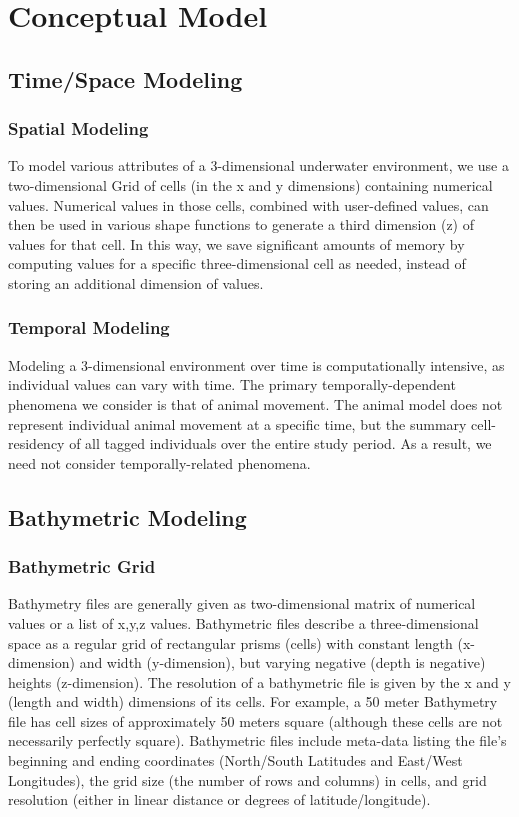 \section{Conceptual Model}
\label{conceptualModel}
\subsection{Time/Space Modeling}
\label{timeSpaceModel}
\subsubsection{Spatial Modeling}
\label{spatialModeling}
To model various attributes of a 3-dimensional underwater environment, we use a two-dimensional Grid of cells (in the x and y dimensions) containing numerical values.  Numerical values in those cells, combined with user-defined values, can then be used in various shape functions to generate a third dimension (z) of values for that cell.  In this way, we save significant amounts of memory by computing values for a specific three-dimensional cell as needed, instead of storing an additional dimension of values.  

\subsubsection{Temporal Modeling}
\label{temporalModeling}
Modeling a 3-dimensional environment over time is computationally intensive, as individual values can vary with time.  The primary temporally-dependent phenomena we consider is that of animal movement.  The animal model does not represent individual animal movement at a specific time, but the summary cell-residency of all tagged individuals over the entire study period.  As a result, we need not consider temporally-related phenomena. 




\subsection{Bathymetric Modeling}
\label{bathymetyricModeling}
\subsubsection{Bathymetric Grid}
\label{bathymetricGrid}
Bathymetry files are generally given as two-dimensional matrix of numerical values or a list of x,y,z values.  Bathymetric files describe a three-dimensional space as a regular grid of rectangular prisms (cells) with constant length (x-dimension) and width (y-dimension), but varying negative (depth is negative)  heights (z-dimension).  The resolution of a bathymetric file is given by the x and y (length and width) dimensions of its cells.  For example, a 50 meter Bathymetry file has cell sizes of approximately 50 meters square (although these cells are not necessarily perfectly square).  Bathymetric files include meta-data listing the file's beginning and ending coordinates (North/South Latitudes and East/West Longitudes), the grid size (the number of rows and columns) in cells, and grid resolution (either in linear distance or degrees of latitude/longitude).

